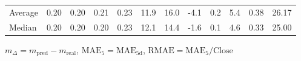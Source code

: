 \begin{threeparttable}
{\begin{tabular}{lrrrrrrrrrrr}
Average &          0.20 &          0.20 &          0.21 &        0.23 &                11.9 &                16.0 &       -4.1 &                 0.2 &              5.4 &            0.38 &                  26.17 \\
 Median &          0.20 &          0.20 &          0.20 &        0.23 &                12.1 &                14.4 &       -1.6 &                 0.1 &              4.6 &            0.33 &                  25.00 \\
\bottomrule
\end{tabular}
}
\begin{tablenotes}\footnotesize
\item $m_\Delta=m_{\text{pred}}-m_{\text{real}}$,
$\mathrm{MAE}_5=\mathrm{MAE}_{5\text{d}}$,
$\mathrm{RMAE}=\mathrm{MAE}_5/\text{Close}$
\end{tablenotes}
\end{threeparttable}
\endgroup

